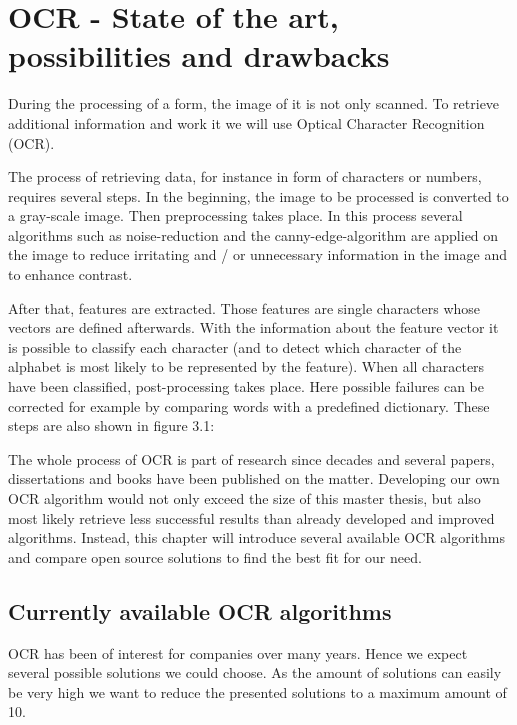 %
% 
\chapter{OCR - State of the art, possibilities and drawbacks}
\label{cha3}

During the processing of a form, the image of it is not only scanned. To retrieve additional information and work it we will use Optical Character Recognition (OCR).

The process of retrieving data, for instance in form of characters or numbers, requires several steps. In the beginning, the image to be processed is converted to a gray-scale image. Then preprocessing takes place. In this process several algorithms such as noise-reduction and the canny-edge-algorithm are applied on the image to reduce irritating and / or unnecessary information in the image and to enhance contrast.

After that, features are extracted. Those features are single characters whose vectors are defined afterwards. With the information about the feature vector it is possible to classify each character (and to detect which character of the alphabet is most likely to be represented by the feature).
When all characters have been classified, post-processing takes place. Here possible failures can be corrected for example by comparing words with a predefined dictionary.
These steps are also shown in figure 3.1:

The whole process of OCR is part of research since decades and several papers, dissertations and books have been published on the matter. Developing our own OCR algorithm would not only exceed the size of this master thesis, but also most likely retrieve less successful results than already developed and improved algorithms. Instead, this chapter will introduce several available OCR algorithms and compare open source solutions to find the best fit for our need.

\label{CurrAvailOCRAlgorithms}
\section{Currently available OCR algorithms}

OCR has been of interest for companies over many years. Hence we expect several possible solutions we could choose. As the amount of solutions can easily be very high we want to reduce the presented solutions to a maximum amount of 10.

